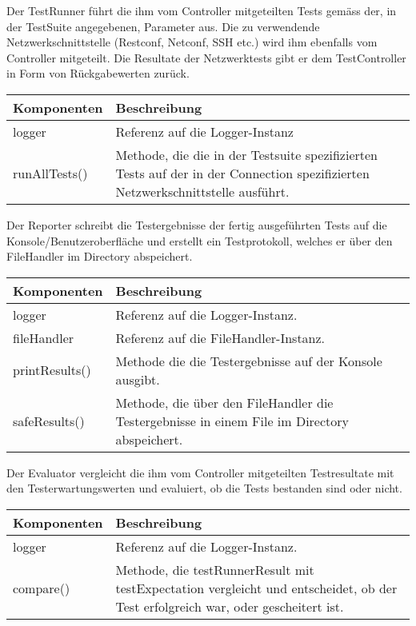 \documentclass[]{subfiles}
\begin{document}
	Der TestRunner führt die ihm vom Controller mitgeteilten Tests gemäss der, in der TestSuite angegebenen, Parameter aus. 
	Die zu verwendende Netzwerkschnittstelle (Restconf, Netconf, SSH etc.) wird ihm ebenfalls vom Controller mitgeteilt.
	Die Resultate der Netzwerktests gibt er dem TestController in Form von Rückgabewerten zurück.

	\begin{tabularx}{\textwidth}{lX}
		\toprule
			Komponenten & Beschreibung \\
		\midrule
			logger & Referenz auf die Logger-Instanz \\ 
		\midrule
			runAllTests() & Methode, die die in der Testsuite spezifizierten Tests auf der in der Connection spezifizierten Netzwerkschnittstelle ausführt. \\
		\bottomrule
	\end{tabularx}
	\newpage

	Der Reporter schreibt die Testergebnisse der fertig ausgeführten Tests auf die Konsole/Benutzeroberfläche und erstellt ein Testprotokoll, welches er über den FileHandler im Directory abspeichert.

	\begin{tabularx}{\textwidth}{lX}
		\toprule
			Komponenten & Beschreibung \\
		\midrule
			logger & Referenz auf die Logger-Instanz. \\
			fileHandler & Referenz auf die FileHandler-Instanz. \\	
		\midrule
			printResults() & Methode die die Testergebnisse auf der Konsole ausgibt. \\
			safeResults() & Methode, die über den FileHandler die Testergebnisse in einem File im Directory abspeichert. \\
		\bottomrule
	\end{tabularx}

	Der Evaluator vergleicht die ihm vom Controller mitgeteilten Testresultate mit den Testerwartungswerten und evaluiert, ob die Tests bestanden sind oder nicht.

	\begin{tabularx}{\textwidth}{lX}
		\toprule
			Komponenten & Beschreibung \\
		\midrule
			logger & Referenz auf die Logger-Instanz. \\
		\midrule
			compare() & Methode, die testRunnerResult mit testExpectation vergleicht und entscheidet, ob der Test erfolgreich war, oder gescheitert ist. \\
		\bottomrule
	\end{tabularx}
	\newpage
\end{document}

